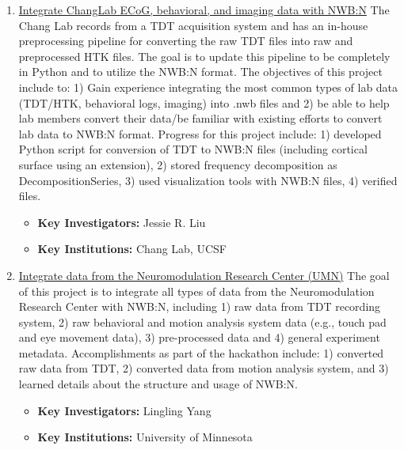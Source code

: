 \documentclass{article}
\begin{document}
\begin{enumerate}
    \item \href{https://neurodatawithoutborders.github.io/nwb_hackathons/HCK06_2019_Janelia/projects/changlab_to_nwb/}{Integrate ChangLab ECoG, behavioral, and imaging data with NWB:N} The Chang Lab records from a TDT acquisition system and has an in-house preprocessing pipeline for converting the raw TDT files into raw and preprocessed HTK files. The goal is to update this pipeline to be completely in Python and to utilize the NWB:N format. The objectives of this project include to: 1) Gain experience integrating the most common types of lab data (TDT/HTK, behavioral logs, imaging) into .nwb files and 2) be able to help lab members convert their data/be familiar with existing efforts to convert lab data to NWB:N format. Progress for this project include: 1) developed Python script for conversion of TDT to NWB:N files (including cortical surface using an extension), 2) stored frequency decomposition as DecompositionSeries, 3) used visualization tools with NWB:N files, 4) verified files. 
        \vspace{-0.2cm}
        \begin{itemize}[noitemsep]
            \item \textbf{Key Investigators:} Jessie R. Liu 
            \item \textbf{Key Institutions:} Chang Lab, UCSF
        \end{itemize}
        
    \item \href{https://neurodatawithoutborders.github.io/nwb_hackathons/HCK06_2019_Janelia/projects/NMRC/}{Integrate data from the Neuromodulation Research Center (UMN)} The goal of this project is to integrate all types of data from the Neuromodulation Research Center with NWB:N, including 1) raw data from TDT recording system, 2) raw behavioral and motion analysis system data (e.g., touch pad and eye movement data), 3) pre-processed data and 4) general experiment metadata. Accomplishments as part of the hackathon include: 1) converted raw data from TDT, 2) converted data from motion analysis system, and 3) learned details about the structure and usage of NWB:N. 
        \vspace{-0.2cm}
        \begin{itemize}[noitemsep]
            \item \textbf{Key Investigators:} Lingling Yang 
            \item \textbf{Key Institutions:} University of Minnesota
        \end{itemize}
        

\end{enumerate}
\end{document}
